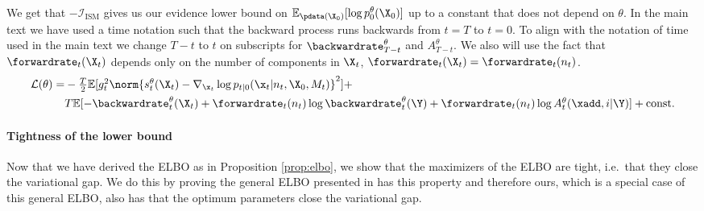 We get that $-\mathcal{I}_{\text{ISM}}$ gives us our evidence lower bound on
$\mathbb{E}_{\pdata(\X_0)} [ \log p_0^\theta(\X_0) ]$ up to a constant that does
not depend on $\theta$. In the main text we have used a time notation such that
the backward process runs backwards from $t=T$ to $t=0$. To align with the
notation of time used in the main text we change $T-t$ to $t$ on subscripts for
$\backwardrate_{T-t}^\theta$ and $A_{T-t}^\theta$. We also will use the fact
that $\forwardrate_t(\X_t)$ depends only on the number of components in $\X_t$,
$\forwardrate_t(\X_t) = \forwardrate_t(n_t)$.
\begin{align}
    \mathcal{L}(\theta) = &\textstyle  -\frac{T}{2} \mathbb{E} [g_t^2 \norm{ s_t^\theta(\X_t) - \nabla_{\x_t} \log p_{t|0}(\x_t | n_t, \X_0, M_t)}^2 ] + \\
    &\textstyle T\mathbb{E} [ - \backwardrate_{t}^\theta(\X_t) + \forwardrate_t(n_t) \log \backwardrate_{t}^\theta(\Y) + \forwardrate_t(n_t) \log A_{t}^\theta(\xadd, i | \Y) ] + \text{const} . 
\end{align}




\paragraph{Tightness of the lower bound}
\label{sec:tddm-tightness-}
Now that we have derived the ELBO as in Proposition \ref{prop:elbo}, we show that the maximizers of the ELBO are tight, i.e.~that they close the variational
gap. We do this by proving the general ELBO presented in \cite{benton2022denoising} has this property and therefore ours, which is a special case of this general ELBO, also has that the optimum parameters close the variational gap.

